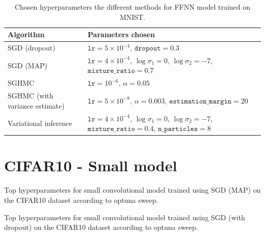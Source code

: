 \begin{table}[H]
    \centering
    \begin{tabular}{p{4cm}p{9cm}}
        \toprule
        Algorithm & Parameters chosen \\ \midrule
        SGD (dropout) & $\texttt{lr}=5\times 10^{-4}$,
        $\texttt{dropout}=0.3$ \\ \midrule
        SGD (MAP) & 
        $\texttt{lr}=4 \times 10^{-4}$, 
        $\log\sigma_1=0$, 
        $\log\sigma_2=-7$, 
        $\texttt{mixture\_ratio}=0.7$ \\ \midrule
        SGHMC & $\texttt{lr}=10^{-6}$, $\alpha=0.05$ \\ \midrule
        SGHMC (with variance estimate) &  $\texttt{lr}= 5 \times 10^{-8}$, 
        $\alpha=0.003$,
        $\texttt{estimation\_margin}=20$ \\ \midrule
        Variational inference &    
        $\texttt{lr}=4 \times 10^{-4}$,
        $\log\sigma_1=0$,
        $\log\sigma_2=-7$,
        $\texttt{mixture\_ratio}=0.4$,
        $\texttt{n\_particles}=8$ \\
        \bottomrule
    \end{tabular}
    \caption{Chosen hyperparameters the different methods for FFNN model trained on MNIST.}
    \label{tab:mnist-hparams}
\end{table}

\FloatBarrier

\section{CIFAR10 - Small model}

\begin{table}[H]
    \centering
    \resizebox{
        \ifdim\width>\columnwidth
        \columnwidth
      \else
        \width
      \fi
    }{!}{\small
    
    }
    \caption{Top hyperparameters for small convolutional model trained using SGD (MAP) on the CIFAR10 dataset according to optuna sweep.}
    \label{tab:cifar-small-sgd-map-hparams}
\end{table}

\begin{table}[H]
    \centering
    \resizebox{
        \ifdim\width>\columnwidth
        \columnwidth
      \else
        \width
      \fi
    }{!}{\small
    
    }
    \caption{Top hyperparameters for small convolutional model trained using SGD (with dropout) on the CIFAR10 dataset according to optuna sweep.}
    \label{tab:cifar-small-sgd-dropout-hparams}
\end{table}

